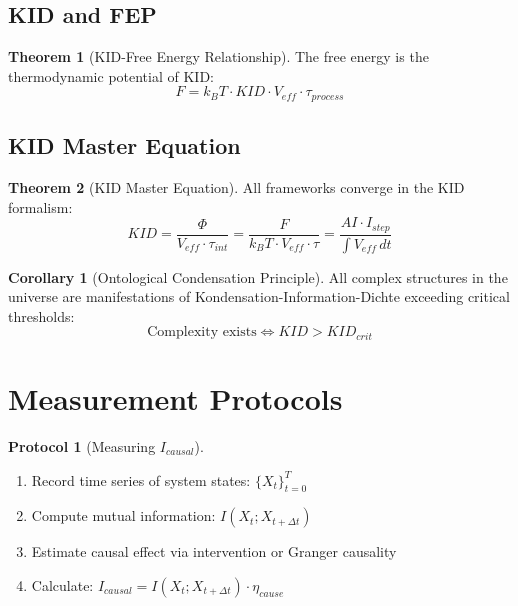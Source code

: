 \documentclass[11pt,a4paper]{article}
\theoremstyle{definition}
\newtheorem{theorem}{Theorem}[section]
\newtheorem{corollary}{Corollary}[section]
\newtheorem{protocol}{Protocol}[section]
\begin{document}
\subsection{KID and FEP}

\begin{theorem}[KID-Free Energy Relationship]
The free energy is the thermodynamic potential of KID:
\begin{equation}
F = k_B T \cdot KID \cdot V_{eff} \cdot \tau_{process}
\end{equation}
\end{theorem}

\subsection{KID Master Equation}

\begin{theorem}[KID Master Equation]
All frameworks converge in the KID formalism:
\begin{equation}
KID = \frac{\Phi}{V_{eff} \cdot \tau_{int}} = \frac{F}{k_B T \cdot V_{eff} \cdot \tau} = \frac{AI \cdot I_{step}}{\int V_{eff} \, dt}
\end{equation}
\end{theorem}

\begin{corollary}[Ontological Condensation Principle]
All complex structures in the universe are manifestations of Kondensation-Information-Dichte exceeding critical thresholds:
\begin{equation}
\text{Complexity exists} \iff KID > KID_{crit}
\end{equation}
\end{corollary}

\section{Measurement Protocols}

\begin{protocol}[Measuring $I_{causal}$]
\begin{enumerate}
\item Record time series of system states: $\{X_t\}_{t=0}^{T}$
\item Compute mutual information: $I(X_t; X_{t+\Delta t})$
\item Estimate causal effect via intervention or Granger causality
\item Calculate: $I_{causal} = I(X_t; X_{t+\Delta t}) \cdot \eta_{cause}$
\end{enumerate}
\end{protocol}
\end{document}
